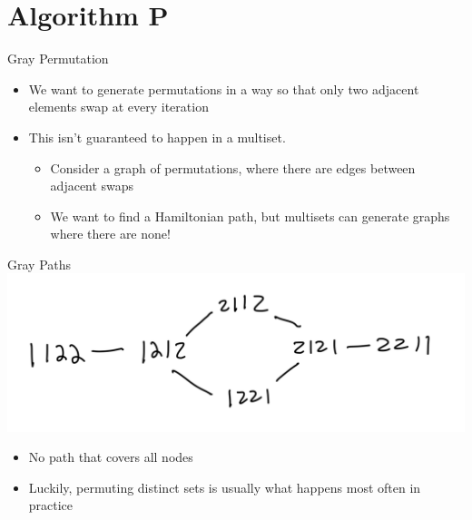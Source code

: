 \documentclass[aspectratio=169]{beamer}
\begin{document}
\section{Algorithm P}
\frame{\sectionpage}

\begin{frame}{Gray Permutation}
\begin{itemize}
    \item We want to generate permutations in a way so that only two adjacent elements swap at every iteration \pause
    \item This isn't guaranteed to happen in a multiset. \pause
    \begin{itemize}
        \item Consider a graph of permutations, where there are edges between adjacent swaps
        \item We want to find a Hamiltonian path, but multisets can generate graphs where there are none!
    \end{itemize}
\end{itemize}
\end{frame}

\begin{frame}{Gray Paths}
\includegraphics[scale=.25]{image.png}

\begin{itemize}
    \item No path that covers all nodes \pause
    \item Luckily, permuting distinct sets is usually what happens most often in practice
\end{itemize}
\end{frame}
\end{document}
